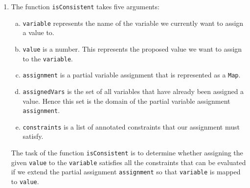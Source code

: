 \begin{enumerate}
      In \textsl{TypeScript} or \textsl{Python}, a string containing an expression can be evaluated with the
      function \texttt{eval}.  \textsl{Java} does not have such a function.  Instead, the function
      \texttt{compileConstraints} generates the source code of a \textsl{Java} class that contains a static method
      for every formula.  For example, for the formula \texttt{Q1 != Q2} it creates the method
      \begin{verbatim}
        public static boolean test0(Map<String, Integer> A) {
            int Q1 = A.get("Q1");
            int Q2 = A.get("Q2");
            return Q1 != Q2;
        }
      \end{verbatim}
      This class is then compiled with the \textsl{Java} compiler, which is part of the \textsl{Java}
      Development Kit and can be accessed via the package \texttt{javax.tools}.  Finally, the compiled class
      is loaded into the running program.  This way, all constraints are compiled only once.  As the details of
      this function require some knowledge of the \textsl{Java} compiler \textsc{Api}, we do not discuss its
      implementation.  It can be found in the file \texttt{ConstraintCompiler.jsh}.
\item The function \texttt{isConsistent} takes five arguments:
  \begin{enumerate}[(a)]
  \item \texttt{variable} represents the name of the variable we currently want to assign a value to.
  \item \texttt{value} is a number. This represents the proposed value we want to assign to the \texttt{variable}.
  \item \texttt{assignment} is a partial variable assignment that is represented as a \texttt{Map}. 
  \item \texttt{assignedVars} is the set of all variables that have already been assigned a value.
        Hence this set is the domain of the partial variable assignment \texttt{assignment}.
  \item \texttt{constraints} is a list of annotated constraints that our assignment must satisfy.
  \end{enumerate}
  The task of the function \texttt{isConsistent} is to determine whether assigning the given \texttt{value} to
  the \texttt{variable} satisfies all the constraints that can be evaluated if we extend the partial assignment
  \texttt{assignment} so that \texttt{variable} is mapped to \texttt{value}.
  

\end{enumerate}
